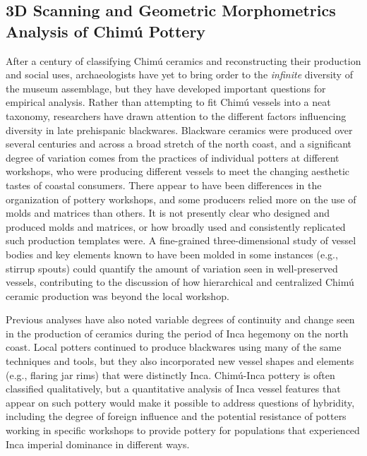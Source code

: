 \documentclass[]{interact}
\theoremstyle{plain}%
\theoremstyle{definition}
\theoremstyle{remark}
\begin{document}
\hypertarget{d-scanning-and-geometric-morphometrics-analysis-of-chimuxfa-pottery}{%
\subsection{3D Scanning and Geometric Morphometrics Analysis of Chimú
Pottery}\label{d-scanning-and-geometric-morphometrics-analysis-of-chimuxfa-pottery}}

After a century of classifying Chimú ceramics and reconstructing their
production and social uses, archaeologists have yet to bring order to
the \emph{infinite} diversity of the museum assemblage, but they have
developed important questions for empirical analysis. Rather than
attempting to fit Chimú vessels into a neat taxonomy, researchers have
drawn attention to the different factors influencing diversity in late
prehispanic blackwares. Blackware ceramics were produced over several
centuries and across a broad stretch of the north coast, and a
significant degree of variation comes from the practices of individual
potters at different workshops, who were producing different vessels to
meet the changing aesthetic tastes of coastal consumers. There appear to
have been differences in the organization of pottery workshops, and some
producers relied more on the use of molds and matrices than others. It
is not presently clear who designed and produced molds and matrices, or
how broadly used and consistently replicated such production templates
were. A fine-grained three-dimensional study of vessel bodies and key
elements known to have been molded in some instances (e.g., stirrup
spouts) could quantify the amount of variation seen in well-preserved
vessels, contributing to the discussion of how hierarchical and
centralized Chimú ceramic production was beyond the local workshop.

Previous analyses have also noted variable degrees of continuity and
change seen in the production of ceramics during the period of Inca
hegemony on the north coast. Local potters continued to produce
blackwares using many of the same techniques and tools, but they also
incorporated new vessel shapes and elements (e.g., flaring jar rims)
that were distinctly Inca. Chimú-Inca pottery is often classified
qualitatively, but a quantitative analysis of Inca vessel features that
appear on such pottery would make it possible to address questions of
hybridity, including the degree of foreign influence and the potential
resistance of potters working in specific workshops to provide pottery
for populations that experienced Inca imperial dominance in different
ways.
\end{document}
